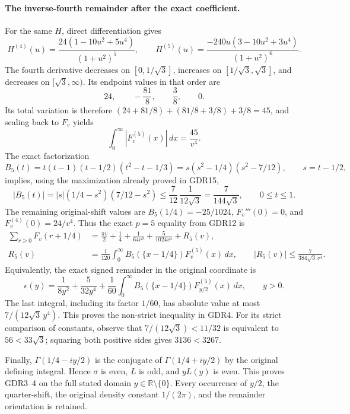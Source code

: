 \documentclass[11pt,a4paper]{article}
\begin{document}
\paragraph{The inverse-fourth remainder after the exact coefficient.}
For the same $H$, direct differentiation gives
\[
 H^{(4)}(u)=\frac{24(1-10u^2+5u^4)}{(1+u^2)^5},\qquad
 H^{(5)}(u)=\frac{-240u(3-10u^2+3u^4)}{(1+u^2)^6}.
 \tag{GDR17}
\]
The fourth derivative decreases on $[0,1/\sqrt3]$, increases on
$[1/\sqrt3,\sqrt3]$, and decreases on $[\sqrt3,\infty)$.
Its endpoint values in that order are
\[
 24,\qquad-\frac{81}{8},\qquad\frac38,\qquad0.
\]
Its total variation is therefore
$(24+81/8)+(81/8+3/8)+3/8=45$, and scaling back to $F_v$ yields
\[
 \int_0^\infty|F_v^{(5)}(x)|\,dx=\frac{45}{v^4}.
 \tag{GDR18}
\]
The exact factorization
\[
 B_5(t)=t(t-1)(t-1/2)(t^2-t-1/3)
       =s(s^2-1/4)(s^2-7/12),\qquad s=t-1/2,
 \tag{GDR19}
\]
implies, using the maximization already proved in GDR15,
\[
 |B_5(t)|
 =|s|(1/4-s^2)(7/12-s^2)
 \le\frac7{12}\,\frac1{12\sqrt3}
 =\frac7{144\sqrt3},\qquad 0\le t\le1.
 \tag{GDR20}
\]
The remaining original-shift values are
$B_5(1/4)=-25/1024$, $F_v'''(0)=0$, and
$F_v^{(4)}(0)=24/v^4$. Thus the exact $p=5$ equality from GDR12 is
\[
\begin{split}
 \sum_{r\ge0}F_v(r+1/4)
 &=\frac{\pi v}{2}+\frac14+\frac1{64v^2}
       +\frac5{1024v^4}+R_5(v),\\
 R_5(v)&=\frac1{120}\int_0^\infty
 B_5(\{x-1/4\})F_v^{(5)}(x)\,dx,\qquad
 |R_5(v)|\le\frac7{384\sqrt3\,v^4}.
\end{split}
 \tag{GDR21}
\]
Equivalently, the exact signed remainder in the original coordinate is
\[
 \epsilon(y)=\frac1{8y^2}+\frac5{32y^4}
 +\frac1{60}\int_0^\infty
  B_5(\{x-1/4\})F_{y/2}^{(5)}(x)\,dx,
 \qquad y>0.
 \tag{GDR22}
\]
The last integral, including its factor $1/60$, has absolute value
at most $7/(12\sqrt3\,y^4)$. This proves the non-strict inequality
in GDR4. For its strict comparison of constants, observe that
$7/(12\sqrt3)<11/32$ is equivalent to $56<33\sqrt3$; squaring
both positive sides gives $3136<3267$.

Finally, $\Gamma(1/4-iy/2)$ is the conjugate of
$\Gamma(1/4+iy/2)$ by the original defining integral. Hence $\sigma$
is even, $L$ is odd, and $yL(y)$ is even. This proves GDR3--4
on the full stated domain $y\in\mathbb R\setminus\{0\}$.
Every occurrence of $y/2$, the quarter-shift, the original density
constant $1/(2\pi)$, and the remainder orientation is retained.

\end{document}
